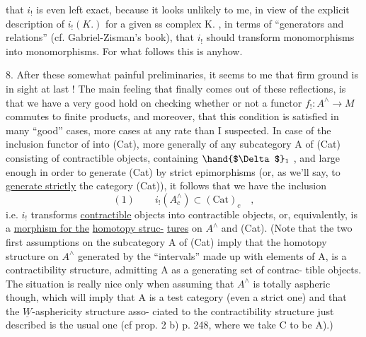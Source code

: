 that $i_!$ is even left exact,  because it looks unlikely to me, in view
of the explicit description of $i_!(K.)$ for a given ss complex K. , in
terms of ``generators and relations'' (cf. Gabriel-Zisman's book),  that
$i_!$ should transform monomorphisms into monomorphisms.  For what follows
this is  anyhow.

8.  After these somewhat painful preliminaries,  it seems to me that
firm ground is in sight at last !  The main feeling that finally comes
out of these reflections,  is that we have a very good hold on checking
whether or not a functor $f_! : A^\wedge \to M$ commutes to finite products,  and
moreover,  that this condition is satisfied in many ``good'' cases,  
more cases at any rate than I suspected.  In case of the inclusion
functor of \hand{$\Delta$} into (Cat),  more generally of any  subcategory  A
of (Cat) consisting of contractible objects,  containing $\hand{$\Delta$}_1$ ,  and
large enough in order to generate (Cat) by strict epimorphisms (or, as
we'll say,  to \uline{generate strictly} the category (Cat)),  it follows that
we have the inclusion
\[ (1) \qquad i_!(A^\wedge_c) \subset (\mathrm{Cat})_c \quad , \]
i.e.  $i_!$ transforms \uline{contractible} objects into contractible objects,
or,  equivalently,  is a \uline{morphism for the}  \uline{homotopy struc-}%
\uline{tures} on $A^\wedge$ and (Cat).  (Note that the two first assumptions on the
subcategory A of (Cat)  imply that the  homotopy structure
on $A^\wedge$ generated by the ``intervals'' made up with elements of A,  is a
contractibility structure,  admitting A as a generating set of contrac-%
tible objects.  The situation is really nice only when assuming that $A^\wedge$
is totally aspheric though,  which will imply that A\xout{$^\wedge$} is a  test
category (even a strict one) and that the $\underline{W}$-asphericity structure  asso-%
ciated to the contractibility structure just described is the usual one
(cf prop. 2 b)  p. 248,  where we take C to be A).)


